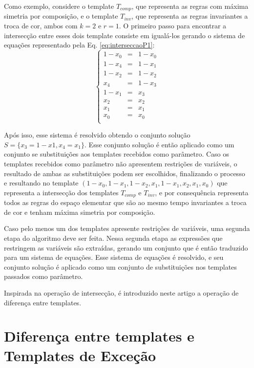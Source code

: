 \documentclass[12pt, a4paper]{article}
\begin{document}
Como exemplo, considere o template $T_{comp}$, que representa as regras com máxima simetria por composição, e o template $T_{inv}$, que representa as regras invariantes a troca de cor, ambos com $k=2$ e $r=1$. O primeiro passo para encontrar a intersecção entre esses dois template consiste em igualá-los gerando o sistema de equações representado pela Eq. \ref{eq:interseccaoP1}:
\begin{equation}
\left\{\begin{matrix}
1 - x_0	& = & 1 - x_0	\\
1 - x_4	& = & 1 - x_1	\\
1 - x_2	& = & 1 - x_2	\\
x_4		& = & 1 - x_3	\\
1 - x_1	& = & x_3		\\
x_2		& = & x_2		\\
x_1		& = & x_1		\\
x_0		& = & x_0		\\
\end{matrix}\right.
\label{eq:interseccaoP1}
\end{equation}

Após isso, esse sistema é resolvido obtendo o conjunto solução $S = \{x_3 = 1-x1, x_4 = x_1\}$. Esse conjunto solução é então aplicado como um conjunto se substituições aos templates recebidos como parâmetro. Caso os templates recebidos como parâmetro não apresentem restrições de variáveis, o resultado de ambas as substituições podem ser escolhidos, finalizando o processo e resultando no template $(1 - x_0, 1 - x_1, 1 - x_2, x_1, 1 - x_1, x_2, x_1, x_0)$ que representa a intersecção dos templates $T_{comp}$ e $T_{inv}$, e por consequência representa todos as regras do espaço elementar que são ao mesmo tempo invariantes a troca de cor e tenham máxima simetria por composição.

Caso pelo menos um dos templates apresente restrições de variáveis, uma segunda etapa do algoritmo deve ser feita. Nessa segunda etapa as expressões que restringem as variáveis são extraídas, gerando um conjunto que é então traduzido para um sistema de equações. Esse sistema de equações é resolvido, e seu conjunto solução é aplicado como um conjunto de substituições nos templates passados como parâmetro.

Inspirada na operação de intersecção, é introduzido neste artigo a operação de diferença entre templates.

\section{Diferença entre templates e Templates de Exceção}
\label{sec:diferenca_entre_templates_e_templates_de_excecao}
\end{document}
